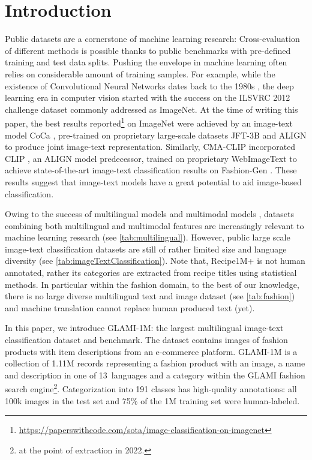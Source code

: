 \documentclass{bmvc2k}
\begin{document}
\restoregeometry



\section{Introduction}
Public datasets are a cornerstone of machine learning research: Cross-evaluation of different methods is possible thanks to public benchmarks with pre-defined training and test data splits. 
Pushing the envelope in machine learning often relies on considerable amount of training samples. For example, while the existence of Convolutional Neural Networks dates back to the 1980s \cite{fukushima1980neocognitron,lecun1989backpropagation}, the deep learning era in computer vision started with the success \cite{krizhevsky2012imagenet} on the ILSVRC 2012 challenge dataset \cite{ILSVRC15} commonly addressed as ImageNet. At the time of writing this paper, the best results reported\footnote{\url{https://paperswithcode.com/sota/image-classification-on-imagenet}} on ImageNet were achieved by an image-text model CoCa \cite{coca}, pre-trained on proprietary large-scale datasets JFT-3B \cite{jft3b} and ALIGN \cite{align} to produce joint image-text representation. Similarly, CMA-CLIP \cite{Liu2021CMACLIPCA} incorporated CLIP \cite{clip}, an ALIGN model \cite{align} predecessor, trained on proprietary WebImageText to achieve state-of-the-art image-text classification results on Fashion-Gen \cite{fashiongen}. These results suggest that image-text models have a great potential to aid image-based classification. 

Owing to the success of multilingual models \cite{bert,xml} and multimodal models \cite{clip,align}, datasets combining both multilingual and multimodal features are increasingly relevant to machine learning research (see \autoref{tab:multilingual}). 
However, public large scale image-text classification datasets \cite{recipe1m+,fashiongen,upmcFood101,Xie2019VisualEA} are still of rather limited size and language diversity (see \autoref{tab:imageTextClassification}). Note that, Recipe1M+ is not human annotated, rather its categories are extracted from recipe titles using statistical methods. In particular within the fashion domain, to the best of our knowledge, there is no large diverse multilingual text and image dataset (see \autoref{tab:fashion}) and machine translation cannot replace human produced text (yet).

In this paper, we introduce GLAMI-1M: the largest multilingual image-text classification dataset and benchmark. The dataset contains images of fashion products with item descriptions from an e-commerce platform. GLAMI-1M is a collection of 1.11M records representing a fashion product with an image, a name and description in one of 13~languages and a category within the GLAMI fashion search engine\footnote{at the point of extraction in 2022.}. 
Categorization into 191 classes has high-quality annotations: all 100k images in the test set and 75\% of the 1M training set were human-labeled. 
\end{document}
